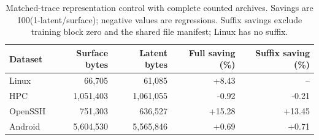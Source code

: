 \begin{table}[t]\centering\small
\caption{Matched-trace representation control with complete counted archives. Savings are 100(1-latent/surface); negative values are regressions. Suffix savings exclude training block zero and the shared file manifest; Linux has no suffix.}
\label{tab:representation-control}
\begin{tabular}{lrrrr}
\toprule
Dataset & Surface bytes & Latent bytes & Full saving (\%) & Suffix saving (\%) \\
\midrule
Linux & 66,705 & 61,085 & +8.43 & -- \\
HPC & 1,051,403 & 1,061,055 & -0.92 & -0.21 \\
OpenSSH & 751,303 & 636,527 & +15.28 & +13.45 \\
Android & 5,604,530 & 5,565,846 & +0.69 & +0.71 \\
\bottomrule
\end{tabular}\end{table}
